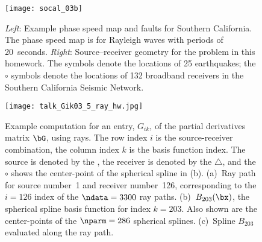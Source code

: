 \documentclass[11pt,titlepage,fleqn]{article}
\begin{document}


\clearpage\pagebreak

\begin{figure}
\hspace{-0.5cm}
\texttt{[image: socal\_03b]}
\caption[Source--receiver geometry for southern California]
{{
{\em Left}: Example phase speed map and faults for Southern California. The phase speed map is for Rayleigh waves with periods of 20~seconds.
{\em Right}: Source--receiver geometry for the problem in this homework. The  symbols denote the locations of 25 earthquakes; the $\circ$ symbols denote the locations of 132 broadband receivers in the Southern California Seismic Network.
\label{fig:geometry}
}}
\end{figure}

\begin{figure}[p]
\hspace{-1.5cm}
\texttt{[image: talk\_Gik03\_5\_ray\_hw.jpg]}
\caption[Basis function]
{{
Example computation for an entry, $G_{ik}$, of the partial derivatives matrix $\bG$, using rays. The row index $i$ is the source-receiver combination, the column index $k$ is the basis function index. The source is denoted by the , the receiver is denoted by the $\triangle$, and the $\circ$ shows the center-point of the spherical spline in (b).
(a)~Ray path for source number~1 and receiver number~126, corresponding to the $i=126$ index of the $\ndata=3300$ ray paths.
(b)~$B_{203}(\bx)$, the spherical spline basis function for index $k=203$. Also shown are the center-points of the $\nparm=286$ spherical splines.
(c)~Spline $B_{203}$ evaluated along the ray path.
\label{fig:basis}
}}
\end{figure}

\end{document}
